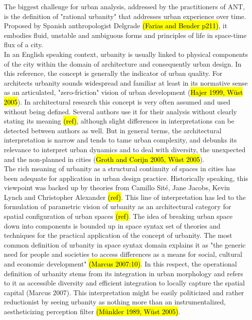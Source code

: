 \documentclass[11pt]{report}
\begin{document}
The biggest challenge for urban analysis, addressed by the practitioners of ANT, is the definition of "rational urbanity" that addresses urban experience over time. Proposed by Spanish anthropologist Delgrade \hl{(Farias and Bender p211)}, it embodies fluid, unstable and ambiguous forms and principles of life in space-time flux of a city.
\\
In an English speaking context, urbanity is usually linked to physical components of the city within the domain of architecture and consequently urban design.
In this reference, the concept is generally the indicator of urban quality. For architects urbanity sounds widespread and familiar at least in its normative sense as an articulated, "zero-friction" vision of urban development (\hl{Hajer 1999, Wüst 2005}).
In architectural research this concept is very often assumed and used without being defined. Several authors use it for their analysis without clearly stating its meaning \hl{(ref)}, although slight differences in interpretations can be detected between authors as well.
But in general terms, the architectural interpretation is narrow and tends to tame urban complexity, and debunks its relevance to interpret urban dynamics  and to deal with diversity, the unexpected and the non-planned in cities (\hl{Groth and Corijn 2005, Wüst 2005}). 
\\
The rich meaning of urbanity as a structural continuity of spaces in cities has been adequate for application in urban design practice. Historically speaking, this viewpoint was backed up by theories from Camillo Sité, Jane Jacobs, Kevin Lynch and Christopher Alexander \hl{(ref)}.
This line of interpretation has led to the formulation of parametric vision of urbanity as an architectural category for spatial configuration of urban spaces \hl{(ref)}.
The idea of breaking urban space down into components is bounded up in space syntax set of theories and techniques for the practical application of the concept of urbanity.
The most common definition of urbanity in space syntax domain explains it as "the generic need for people and societies to access differences as a means for social, cultural and economic development" \hl{(Marcus 2007:10)}.
In this respect, the operational definition of urbanity stems from its integration in urban morphology  and refers to it as accessible diversity and efficient integration to locally capture the spatial capital \hl{}(Marcus 2007).
This interpretation might be easily politicized and rather reductionist by seeing urbanity as nothing more than an instrumentalized, aestheticizing perception filter \hl{(Münkler 1989, Wüst 2005)}.
\end{document}
